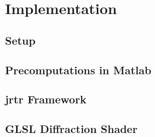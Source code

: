 \section{Implementation}
\subsection{Setup}
\subsection{Precomputations in Matlab}
\subsection{jrtr Framework}
\subsection{GLSL Diffraction Shader}
